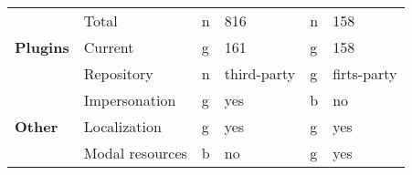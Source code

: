 \begin{table}[]
\begin{tabular}{llllll}
        \multirow{3}{*}{\textbf{Plugins}}        & Total                  & n  & 816                             & n  & 158                                      \\
        & Current                & g  & 161                             & g  & 158                                      \\
        & Repository             & n  & third-party                     & g  & firts-party                              \\
        \multirow{3}{*}{\textbf{Other}}          & Impersonation          & g  & yes                             & b  & no                                       \\
        & Localization           & g  & yes                             & g  & yes                                      \\
        & Modal resources        & b  & no                              & g  & yes
    \end{tabular}
\end{table}
